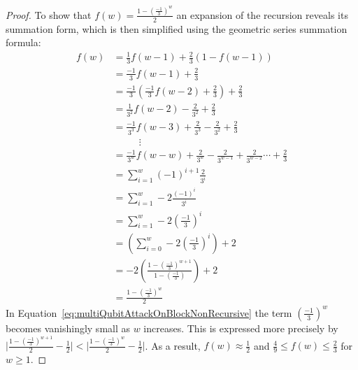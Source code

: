 \begin{proof}
To show that $f(w) = \frac{1-(\frac{-1}{3})^w}{2}$ an expansion of the recursion reveals its summation form, which is then simplified using the geometric series summation formula:
\begin{align}
f(w) &= \frac{1}{3}f(w - 1) + \frac{2}{3}(1 - f(w - 1))\\
&= \frac{-1}{3}f(w - 1) + \frac{2}{3}\\
&= \frac{-1}{3}(\frac{-1}{3}f(w - 2) + \frac{2}{3}) + \frac{2}{3}\\
&= \frac{1}{3^2}f(w - 2) - \frac{2}{3^2} + \frac{2}{3}\\
&= \frac{-1}{3^3}f(w - 3) + \frac{2}{3^3} - \frac{2}{3^2} + \frac{2}{3}\\
&\ \ \ \ \ \ \ \ \ \ \ \ \vdots \\
&= \frac{-1}{3^w}f(w - w) + \frac{2}{3^w} - \frac{2}{3^{w-1}} + \frac{2}{3^{w-2}} \cdots +\frac{2}{3}\\
&= \sum_{i=1} ^{w} (-1)^{i+1} \frac{2}{3^i} \\
&= \sum_{i=1} ^{w} -2 \frac{(-1)^{i}}{3^i} \\
&= \sum_{i=1} ^{w} -2 \left(\frac{-1}{3}\right)^i \\
&= \left(\sum_{i=0} ^{w} -2 \left (\frac{-1}{3}\right)^i\right) + 2 \\
&= -2\left(\frac{1-(\frac{-1}{3})^{w+1}}{1-(\frac{-1}{3})}\right) + 2 \\
&= \frac{1-(\frac{-1}{3})^w}{2}  \label{eq:multiQubitAttackOnBlockNonRecursive}
\end{align}
In Equation~\eqref{eq:multiQubitAttackOnBlockNonRecursive} the term $(\frac{-1}{3})^w$ becomes vanishingly small as $w$ increases. This is expressed more precisely by $\lvert \frac{1-(\frac{-1}{3})^{w+1}}{2} - \frac{1}{2} \rvert < \lvert \frac{1-(\frac{-1}{3})^w}{2} - \frac{1}{2} \rvert$. As a result, $f(w) \approx \frac{1}{2}$ and $\frac{4}{9} \leq f(w) \leq \frac{2}{3}$ for $w \geq 1$.
\end{proof}

